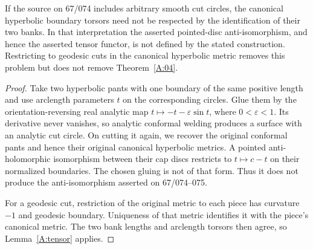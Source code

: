 \begin{proposition}\label{A:arbitrarycuts}
If the source on 67/074 includes arbitrary smooth cut circles, the
canonical hyperbolic boundary torsors need not be respected by the
identification of their two banks. In that interpretation the asserted
pointed-disc anti-isomorphism, and hence the asserted tensor functor,
is not defined by the stated construction. Restricting to geodesic
cuts in the canonical hyperbolic metric removes this problem but does
not remove Theorem~\ref{A:04}.
\end{proposition}
\begin{proof}
Take two hyperbolic pants with one boundary of the same positive
length and use arclength parameters $t$ on the corresponding circles.
Glue them by the orientation-reversing real analytic map
$t\mapsto-t-\varepsilon\sin t$, where $0<\varepsilon<1$.
Its derivative never vanishes, so analytic conformal welding produces
a surface with an analytic cut circle. On cutting it again, we recover
the original conformal pants and hence their original canonical
hyperbolic metrics. A pointed anti-holomorphic isomorphism between
their cap discs restricts to $t\mapsto c-t$ on their normalized
boundaries. The chosen gluing is not of that form. Thus it does not
produce the anti-isomorphism asserted on 67/074--075.

For a geodesic cut, restriction of the original metric to each piece
has curvature $-1$ and geodesic boundary. Uniqueness of that metric
identifies it with the piece's canonical metric. The two bank lengths
and arclength torsors then agree, so Lemma~\ref{A:tensor} applies.
\end{proof}

